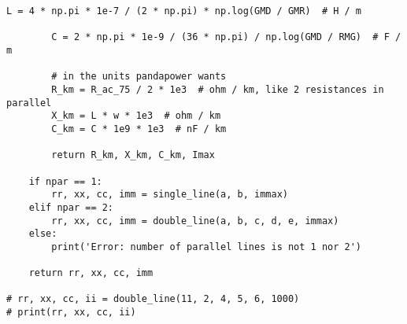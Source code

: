 \begin{lstlisting}[caption={Code for the calculation of lines}]
        L = 4 * np.pi * 1e-7 / (2 * np.pi) * np.log(GMD / GMR)  # H / m

        C = 2 * np.pi * 1e-9 / (36 * np.pi) / np.log(GMD / RMG)  # F / m

        # in the units pandapower wants
        R_km = R_ac_75 / 2 * 1e3  # ohm / km, like 2 resistances in parallel
        X_km = L * w * 1e3  # ohm / km
        C_km = C * 1e9 * 1e3  # nF / km

        return R_km, X_km, C_km, Imax

    if npar == 1:
        rr, xx, cc, imm = single_line(a, b, immax)
    elif npar == 2:
        rr, xx, cc, imm = double_line(a, b, c, d, e, immax)
    else:
        print('Error: number of parallel lines is not 1 nor 2')

    return rr, xx, cc, imm

# rr, xx, cc, ii = double_line(11, 2, 4, 5, 6, 1000)
# print(rr, xx, cc, ii)

\end{lstlisting}

